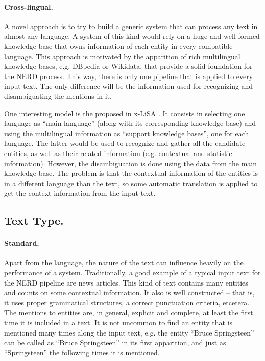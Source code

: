 \paragraph{Cross-lingual.}

A novel approach is to try to build a generic system that can process any text in almost any language. A system of this kind would rely on a huge and well-formed knowledge base that owns information of each entity in every compatible language. This approach is motivated by the apparition of rich multilingual knowledge bases, e.g. DBpedia or Wikidata, that provide a solid foundation for the NERD process. This way, there is only one pipeline that is applied to every input text. The only difference will be the information used for recognizing and disambiguating the mentions in it. 

One interesting model is the proposed in x-LiSA \cite{zhang2014}. It consists in selecting one language as ``main language'' (along with its corresponding knowledge base) and using the multilingual information as ``support knowledge bases'', one for each language. The latter would be used to recognize and gather all the candidate entities, as well as their related information (e.g. contextual and statistic information). However, the disambiguation is done using the data from the main knowledge base. The problem is that the contextual information of the entities is in a different language than the text, so some automatic translation is applied to get the context information from the input text.

\subsection{Text Type.}

\paragraph{Standard.}

Apart from the language, the nature of the text can influence heavily on the performance of a system. Traditionally, a good example of a typical input text for the NERD pipeline are news articles. This kind of text contains many entities and counts on some contextual information. It also is well constructed -- that is, it uses proper grammatical structures, a correct punctuation criteria, etcetera. The mentions to entities are, in general, explicit and complete, at least the first time it is included in a text. It is not uncommon to find an entity that is mentioned many times along the input text, e.g. the entity ``Bruce Springsteen'' can be called as ``Bruce Springsteen'' in its first apparition, and just as ``Springsteen'' the following times it is mentioned.

